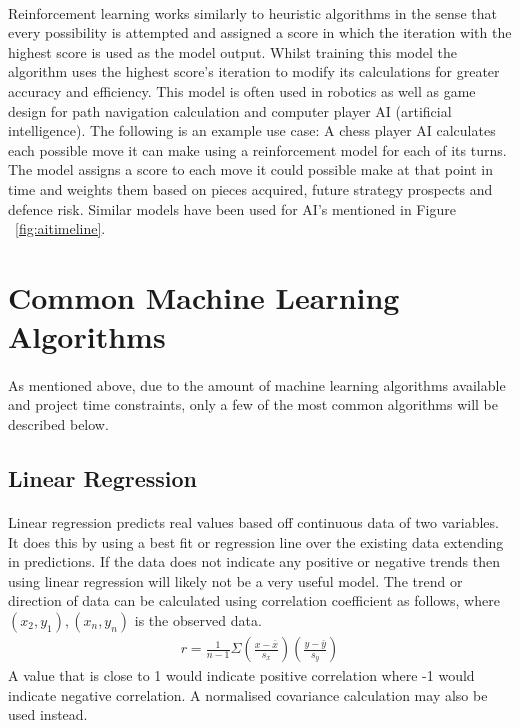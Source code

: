 \paragraph{}Reinforcement learning works similarly to heuristic algorithms in the sense that every possibility is attempted and assigned a score in which the iteration with the highest score is used as the model output. Whilst training this model the algorithm uses the highest score's iteration to modify its calculations for greater accuracy and efficiency. This model is often used in robotics as well as game design for path navigation calculation and computer player AI (artificial intelligence). The following is an example use case: A chess player AI calculates each possible move it can make using a reinforcement model for each of its turns. The model assigns a score to each move it could possible make at that point in time and weights them based on pieces acquired, future strategy prospects and defence risk.
Similar models have been used for AI's mentioned in Figure ~\ref{fig:aitimeline}.


\section{Common Machine Learning Algorithms}
\label{sec:section6}

\paragraph{}As mentioned above, due to the amount of machine learning algorithms available and project time constraints, only a few of the most common algorithms will be described below.
\subsection{Linear Regression} 
\paragraph{}Linear regression predicts real values based off continuous data of two variables. It does this by using a best fit or regression line over the existing data extending in predictions. If the data does not indicate any positive or negative trends then using linear regression will likely not be a very useful model. The trend or direction of data can be calculated using correlation coefficient as follows, where $\left( {{x_2},{y_1}} \right),\left( {{x_n},{y_n}} \right)$ is the observed data.
\begin{align*}
r = \frac{1}{{n - 1}}\Sigma \left( {\frac{{x - \bar x}}{{{s_x}}}} \right)\left( {\frac{{y - \bar y}}{{{s_y}}}} \right)
\end{align*}
A value that is close to 1 would indicate positive correlation where -1 would indicate negative correlation. A normalised covariance calculation may also be used instead.
